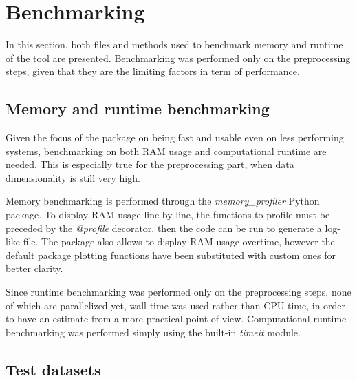 \section{Benchmarking}

In this section, both files and methods used to benchmark memory and runtime of the tool are presented. Benchmarking was performed only on the preprocessing steps, given that they are the limiting factors in term of performance.

\subsection{Memory and runtime benchmarking}

Given the focus of the package on being fast and usable even on less performing systems, benchmarking on both RAM usage and computational runtime are needed. This is especially true for the preprocessing part, when data dimensionality is still very high.

Memory benchmarking is performed through the \emph{memory\_profiler}\cite{memprof} Python package.
To display RAM usage line-by-line, the functions to profile must be preceded by the \emph{@profile} decorator, then the code can be run to generate a log-like file. The package also allows to display RAM usage overtime, however the default package plotting functions have been substituted with custom ones for better clarity.

Since runtime benchmarking was performed only on the preprocessing steps, none of which are parallelized yet, wall time was used rather than CPU time, in order to have an estimate from a more practical point of view. Computational runtime benchmarking was performed simply using the built-in \emph{timeit} module.

\subsection{Test datasets}

